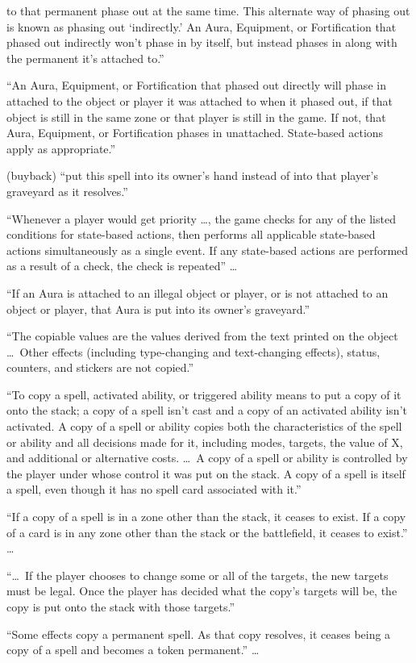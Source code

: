 \documentclass[11pt]{article}
\theoremstyle{definition}
\begin{document}
\begin{description}[leftmargin=1em,itemsep=1pt,parsep=0pt]
  to that permanent phase out at the same time. This alternate way of phasing out is known
  as phasing out `indirectly.' An Aura, Equipment, or Fortification that phased out
  indirectly won't phase in by itself, but instead phases in along with the permanent it's
  attached to.''
\item[702.26i] ``An Aura, Equipment, or Fortification that phased out directly will phase in
  attached to the object or player it was attached to when it phased out, if that object is
  still in the same zone or that player is still in the game. If not, that Aura, Equipment,
  or Fortification phases in unattached. State-based actions apply as appropriate.''
\item[702.27a] (buyback) ``put this spell into its owner's hand instead of into that player's
  graveyard as it resolves.''
\item[704.3] ``Whenever a player would get priority \dots, the game checks for any of the
  listed conditions for state-based actions, then performs all applicable state-based
  actions simultaneously as a single event. If any state-based actions are performed as a
  result of a check, the check is repeated'' \dots
\item[704.5m] ``If an Aura is attached to an illegal object or player, or is not attached to
  an object or player, that Aura is put into its owner's graveyard.''
\item[707.2] ``The copiable values are the values derived from the text printed on the
  object \dots\ Other effects (including type-changing and text-changing effects), status,
  counters, and stickers are not copied.''
\item[707.10] ``To copy a spell, activated ability, or triggered ability means to put a copy
  of it onto the stack; a copy of a spell isn't cast and a copy of an activated ability
  isn't activated. A copy of a spell or ability copies both the characteristics of the
  spell or ability and all decisions made for it, including modes, targets, the value of X,
  and additional or alternative costs. \dots\ A copy of a spell or ability is controlled by
  the player under whose control it was put on the stack. A copy of a spell is itself a
  spell, even though it has no spell card associated with it.''
\item[707.10a] ``If a copy of a spell is in a zone other than the stack, it ceases to exist.
  If a copy of a card is in any zone other than the stack or the battlefield, it ceases to
  exist.'' \dots
\item[707.10c] ``\dots\ If the player chooses to change some or all of the targets, the new
  targets must be legal. Once the player has decided what the copy's targets will be, the
  copy is put onto the stack with those targets.''
\item[707.10f] ``Some effects copy a permanent spell. As that copy resolves, it ceases being a
  copy of a spell and becomes a token permanent.'' \dots
\end{description}
\endgroup
\end{document}
